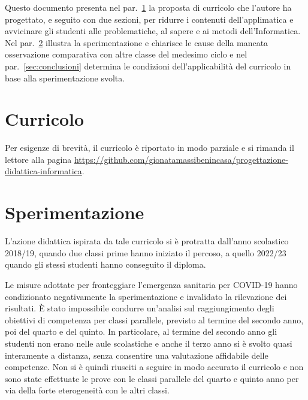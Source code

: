 \documentclass[a4paper]{easychair}
\begin{document}


Questo documento presenta nel par.~\ref{sec:curricolo} la proposta di curricolo
che l'autore ha progettato, e seguito con due sezioni, per ridurre i contenuti dell'applimatica e avvicinare
gli studenti alle problematiche, al sapere e ai metodi dell'Informatica.
Nel par.~\ref{sec:sperimentazione} illustra la sperimentazione e
chiarisce le cause della mancata osservazione comparativa con altre classe del medesimo ciclo e
nel par.~\ref{sec:conclusioni} determina le condizioni dell'applicabilità del curricolo in base
alla sperimentazione svolta.


\section[Curricolo]{Curricolo}
\label{sec:curricolo}

Per esigenze di brevità, il curricolo è riportato in modo parziale e si rimanda il lettore alla pagina \url{https://github.com/gionatamassibenincasa/progettazione-didattica-informatica}.



\section{Sperimentazione}
\label{sec:sperimentazione}

L'azione didattica ispirata da tale curricolo si è protratta dall'anno scolastico
2018/19, quando due classi prime hanno iniziato il percoso, a quello 2022/23 quando gli stessi studenti
hanno conseguito il diploma.

Le misure adottate per fronteggiare l'emergenza sanitaria per COVID-19
hanno condizionato negativamente la sperimentazione e invalidato la
rilevazione dei risultati.
È stato impossibile condurre un'analisi sul raggiungimento degli obiettivi di competenza per classi
parallele, previsto al termine del secondo anno, poi del quarto e del quinto.
In particolare, al termine del secondo anno gli studenti non erano nelle aule scolastiche e
anche il terzo anno si è svolto quasi interamente a distanza, senza consentire
una valutazione affidabile delle competenze.
Non si è quindi riusciti a seguire in modo accurato il curricolo e non sono
state effettuate le prove con le classi parallele del quarto e quinto anno
per via della forte eterogeneità con le altri classi.
\end{document}

